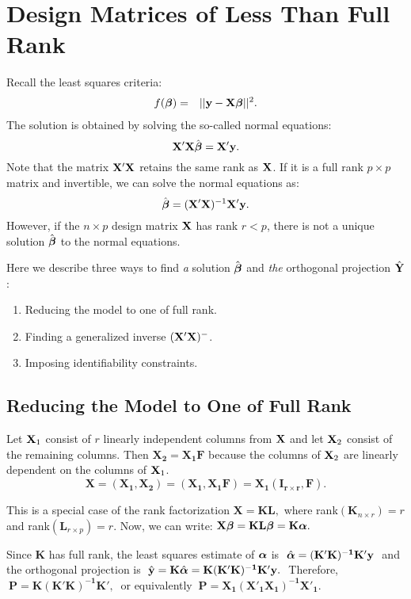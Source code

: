 \section{Design Matrices of Less Than Full Rank}

\vb


Recall the least squares criteria:
\begin{eqnarray}
f({\mbox{\boldmath $\beta$}}) &=& || \mathbf{y} - \mathbf{X} {\mbox{\boldmath $\beta$}} ||^2. \nonumber 
\end{eqnarray}
The solution is obtained by solving the so-called normal equations:
$$\mathbf{X}' \mathbf{X} \hat {\mbox{\boldmath $\beta$}} = \mathbf{X}' \mathbf{y}.$$
Note that the matrix $\mathbf{X}' \mathbf{X}$ retains the same rank as $\mathbf{X}$. 
If it is a full rank $p\times p$ matrix and invertible, we can solve the normal equations as:
\begin{equation}
\hat {\mbox{\boldmath $\beta$}} = (\mathbf{X}' \mathbf{X})^{-1} \mathbf{X}' \mathbf{y}. \nonumber
\end{equation}
However, if the $n\times p$ design matrix $\mathbf{X}$ has rank $r<p$, there is not a unique solution
$\hat{\mbox{\boldmath $\beta$}}$ to the normal equations.  

Here we describe three ways to find
\emph{a} solution $\hat{\mbox{\boldmath $\beta$}}$ and \emph{the} orthogonal projection
$\hat{\mathbf{Y}}$:
\begin{enumerate}
\item Reducing the model to one of full rank.
\item Finding a generalized inverse $(\mathbf{X}'\mathbf{X})^-$.
\item Imposing identifiability constraints.
\end{enumerate}

\vb

\subsection{Reducing the Model to One of Full Rank}

Let $\mathbf{X}_1$ consist of $r$ linearly independent columns from $\mathbf{X}$
and let $\mathbf{X}_2$ consist of the remaining columns.  Then
$\mathbf{X_2=X_1F}$ because the columns of $\mathbf{X}_2$ are linearly
dependent on the columns of $\mathbf{X}_1$.
$$
\mathbf{X=(X_1, X_2)=(X_1, X_1F)=X_1(I_{r\times r}, F)}.
$$

This is a special case of the rank factorization $ \mathbf{X=KL}, $ where
rank$(\mathbf{K}_{n\times r})=r$ and rank$(\mathbf{L}_{r\times p})=r$.
Now, we can write: $\mathbf{X}\mbox{\boldmath $\beta$}=\mathbf{KL}\mbox{\boldmath $\beta$}=\mathbf{K}\mbox{\boldmath $\alpha$}.$

Since $\mathbf K$ has full rank, the least squares estimate of
$\mbox{\boldmath $\alpha$}$ is $\ \hat{\bfalp}=\mathbf{(K'K)^{-1}K'y}\ $ and the
orthogonal projection is $\ \hat{\mathbf{y}} = \mathbf{K}\hat{\mbox{\boldmath $\alpha$}} =
\mathbf{K(K'K)^{-1}K'y}.\ $ Therefore, $\ \mathbf{P=K(K'K)^{-1}K'},\ $
or equivalently $\ \mathbf{P=X_1(X'_1X_1)^{-1}X'_1}$.

